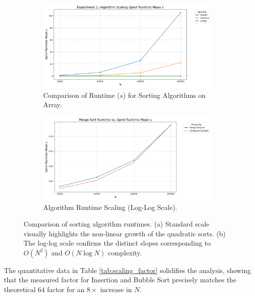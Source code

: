 \documentclass[11pt, a4paper]{article}
\begin{document}
\begin{figure}[h]
    \centering

    \begin{subfigure}[b]{0.48\textwidth}
        \centering
        \includegraphics[width=\textwidth]{plots/experiment_1_algorithm_scaling_runtime_runtime.png}
        \caption{Comparison of Runtime ($s$) for Sorting Algorithms on Array.}
        \label{fig:algorithm_scaling_runtime}
    \end{subfigure}
    \hfill
    \begin{subfigure}[b]{0.48\textwidth}
        \centering
        \includegraphics[width=\textwidth]{plots/complexity_runtime_runtime.png}
        \caption{Algorithm Runtime Scaling (Log-Log Scale).}
        \label{fig:appendix_loglog}
    \end{subfigure}

    \caption{Comparison of sorting algorithm runtimes. (a) Standard scale visually highlights the non-linear growth of the quadratic sorts. (b) The log-log scale confirms the distinct slopes corresponding to $O(N^2)$ and $O(N \log N)$ complexity.}
    \label{fig:combined_runtime}
\end{figure}

The quantitative data in Table \ref{tab:scaling_factor} solidifies the analysis, showing that the measured factor for Insertion and Bubble Sort precisely matches the theoretical $64$ factor for an $8\times$ increase in $N$.
\end{document}
